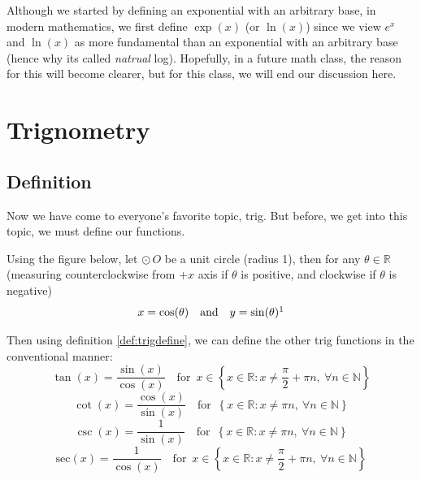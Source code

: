 \documentclass[11pt]{article}
\numberwithin{lemma}{section}
\numberwithin{equation}{section}
\numberwithin{define}{section}
\numberwithin{prop}{section}
\numberwithin{figure}{section}
\numberwithin{theorem}{section}
\numberwithin{cor}{section}
\newcounter{ex}[section]
\numberwithin{ex}{section}
\def\real{\mathbb{R}}
\def\nat{\mathbb{N}}
\def\cbrak#1{\left\{#1\right\}}
\def\jand{\quad\text{and}\quad}
\def\for{\quad\text{for }\,}
\begin{document}
Although we started by defining an exponential with an arbitrary base, in modern mathematics, we first define $\exp(x)$ (or $\ln(x)$) since we view $e^x$ and $\ln(x)$ as more fundamental than an exponential with an arbitrary base (hence why its called \textit{natrual} log). Hopefully, in a future math class, the reason for this will become clearer, but for this class, we will end our discussion here.

\section{Trignometry}
\subsection{Definition}
 Now we have come to everyone's favorite topic, trig. But before, we get into this topic, we must define our functions.
 	\begin{define}
 		\label{def:trigdefine}
		Using the figure below, let $\odot\,O$ be a unit circle (radius 1), then for any $\theta\in\real$ (measuring counterclockwise from $+x$ axis if $\theta$ is positive, and clockwise if $\theta$ is negative)
		$$x=\cos(\theta) \jand y=\sin(\theta)\footnotemark$$
		\begin{center}
	\end{center}
\end{define}


Then using definition \eqref{def:trigdefine}, we can define the other trig functions in the conventional manner:
$$\tan(x)=\frac{\sin(x)}{\cos(x)}
\for x\in \cbrak{x\in\real: x\neq \frac{\pi}{2}+\pi n, \: 
\forall n\in\nat}$$
$$\cot(x)=\frac{\cos(x)}{\sin(x)} 
\for \cbrak{x\in\real :x\neq\pi n, \: 
\forall n\in\nat}$$
$$\csc(x)=\frac{1}{\sin(x)} \for \cbrak{x\in\real :x\neq\pi n, \: 
\forall n\in\nat}$$
$$\text{sec}(x)=\frac{1}{\cos(x)} 
\for x\in \cbrak{x\in\real: x\neq \frac{\pi}{2}+\pi n, \: 
\forall n\in\nat}$$
\end{document}
